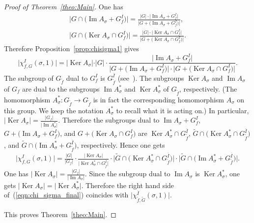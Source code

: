 \documentclass[11pt]{article}
\numberwithin{equation}{section}
\numberwithin{equation}{section}
\begin{document}
\begin{proof}[Proof of Theorem~\ref{theo:Main}]
One has
\begin{gather*}
\big\vert G\cap\big(\operatorname{Im}A_{\sigma} + G_f^I\big)\big\vert =
\frac{\vert G\vert\cdot\big\vert\operatorname{Im}A_{\sigma} + G_f^I\big\vert}{\big\vert G+\big(\operatorname{Im}A_{\sigma} + G_f^I\big)\big\vert}, \\
\big\vert G\cap\big(\operatorname{Ker}A_{\sigma}\cap G_f^I\big)\big\vert =
\frac{\vert G\vert\cdot\big\vert\operatorname{Ker}A_{\sigma}\cap G_f^I\big\vert}{\big\vert G+\big(\operatorname{Ker}A_{\sigma}\cap G_f^I\big)\big\vert}.
\end{gather*}
Therefore Proposition~\ref{prop:chisigma1} gives
\[
 \big\vert \chi_{f,G}^I(\sigma,1)\big\vert=\vert\operatorname{Ker}A_{\sigma}\vert\cdot\vert G\vert\cdot
\frac{\big\vert\operatorname{Im}A_{\sigma}+ G_f^I\big\vert}
{\big\vert G+\big(\operatorname{Im}A_{\sigma}+ G_f^I\big)\big\vert\cdot\big\vert G+\big(\operatorname{Ker}A_{\sigma}\cap G_f^I\big)\big\vert}.
\]
The subgroup of $G_{\widetilde{f}}$ dual to $G_f^I$ is $G_{\widetilde{f}}^{\overline{I}}$
(see~\cite[Lemma~1]{EG-BLMS}).
The subgroups $\operatorname{Ker}A_{\sigma}$ and $\operatorname{Im}A_{\sigma}$ of $G_f$ are dual to the subgroups
$\operatorname{Im}A^*_{\sigma}$ and $\operatorname{Ker}A^*_{\sigma}$ of $G_{\widetilde{f}}$, respectively.
(The homomorphism $A^*_{\sigma}\colon G_{\widetilde{f}}\to G_{\widetilde{f}}$ is in fact the corresponding homomorphism
$A_{\sigma}$ on this group. We keep the notation $A^*_{\sigma}$ to recall what it is acting on.) In particular,
$\vert \operatorname{Ker}A_{\sigma}\vert=\frac{\vert G_f\vert}{\vert \operatorname{Im}A^*_{\sigma}\vert}$.
Therefore the subgroups dual to $\operatorname{Im}A_{\sigma}+ G_f^I$, $G+\big(\operatorname{Im}A_{\sigma}+ G_f^I\big)$, and
$G+\big(\operatorname{Ker}A_{\sigma}\cap G_f^I\big)$ are $\operatorname{Ker}A^*_{\sigma}\cap G_{\widetilde{f}}^{\overline{I}}$,
$\widetilde{G}\cap\big(\operatorname{Ker}A^*_{\sigma} \cap G_{\widetilde{f}}^{\overline{I}}\big)$, and
$\widetilde{G} \cap\big(\operatorname{Im}A^*_{\sigma} + G_{\widetilde{f}}^{\overline{I}}\big)$, respectively. Hence one gets
\begin{gather}\label{eqn:chi_sigma_final}
 \big\vert \chi_{f,G}^I(\sigma,1) \big\vert =
 \frac{\vert G \vert}{\vert G_f \vert} \cdot \frac{\vert\operatorname{Ker}
 A_{\sigma}\vert}{\big\vert\operatorname{Ker}A^*_{\sigma} \cap G_{\widetilde{f}}^{\overline{I}}\big\vert}\cdot
 \big\vert\widetilde{G}\cap\big(\operatorname{Ker}A^*_{\sigma} \cap G_{\widetilde{f}}^{\overline{I}}\big)\big\vert
 \cdot
 \big\vert\widetilde{G}\cap\big(\operatorname{Im}A^*_{\sigma}+ G_{\widetilde{f}}^{\overline{I}}\big)\big\vert.
\end{gather}
One has $\vert\operatorname{Ker}A_{\sigma}\vert=\frac{\vert G_f\vert}{\vert\operatorname{Im}A_{\sigma}\vert}$. Since the subgroup
dual to $\operatorname{Im}A_{\sigma}$ is $\operatorname{Ker}A^*_{\sigma}$, one gets
$\vert\operatorname{Ker}A_{\sigma}\vert=\vert\operatorname{Ker}A^*_{\sigma}\vert$. Therefore the right hand side of~(\ref{eqn:chi_sigma_final}) coincides with $\big\vert \chi_{\widetilde{f},\widetilde{G}}^{\overline{I}}(\sigma,1) \big\vert$.

This proves Theorem~\ref{theo:Main}.
\end{proof}
\end{document}
